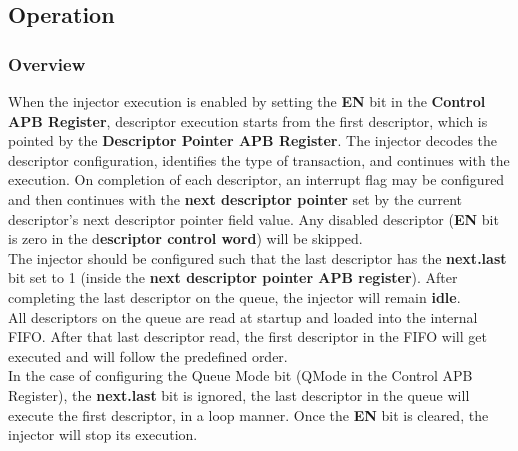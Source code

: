 \subsection{Operation}
\label{operation}

\subsubsection{Overview}
When the injector execution is enabled by setting the \textbf{EN} bit in the \textbf{Control APB Register}, descriptor execution starts from the first descriptor, which is pointed by the \textbf{Descriptor Pointer APB Register}. 
The injector decodes the descriptor configuration, identifies the type of transaction, and continues with the execution. On completion of each descriptor, an interrupt flag may be configured and then continues with the \textbf{next descriptor pointer} set by the current descriptor's next descriptor pointer field value. Any disabled descriptor (\textbf{EN} bit is zero in the d\textbf{escriptor control word}) will be skipped. \\
The injector should be configured such that the last descriptor has the \textbf{next.last} bit set to 1 (inside the \textbf{next descriptor pointer APB register}). After completing the last descriptor on the queue, the injector will remain \textbf{idle}.\\
All descriptors on the queue are read at startup and loaded into the internal FIFO. After that last descriptor read, the first descriptor in the FIFO will get executed and will follow the predefined order.\\
In the case of configuring the Queue Mode bit (QMode in the Control APB Register), the \textbf{next.last} bit is ignored, the last descriptor in the queue will execute the first descriptor, in a loop manner. Once the  \textbf{EN} bit is cleared, the injector will stop its execution. \\

